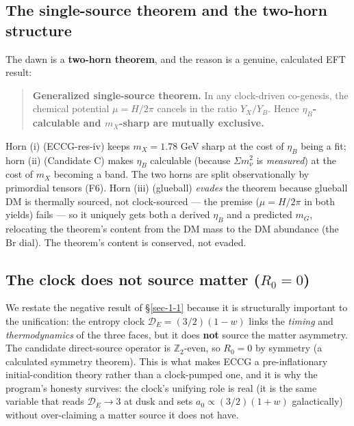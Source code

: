 \documentclass[aps,prd,preprint,nofootinbib,superscriptaddress]{revtex4-2}
\begin{document}
\subsection{The single-source theorem and the two-horn
structure}\label{sec-10-1}

The dawn is a \textbf{two-horn theorem}, and the reason is a genuine,
calculated EFT result:

\begin{quote}
\textbf{Generalized single-source theorem.} In any clock-driven
co-genesis, the chemical potential \(\mu = H/2\pi\) cancels in the ratio
\(Y_X/Y_B\). Hence \textbf{\(\eta_B\)-calculable and \(m_X\)-sharp are
mutually exclusive.}
\end{quote}

Horn (i) (ECCG-res-iv) keeps \(m_X = 1.78\) GeV sharp at the cost of
\(\eta_B\) being a fit; horn (ii) (Candidate C) makes \(\eta_B\)
calculable (because \(\Sigma m_\nu^{2}\) is \emph{measured}) at the cost
of \(m_X\) becoming a band. The two horns are split observationally by
primordial tensors (F6). Horn (iii) (glueball) \emph{evades} the theorem
because glueball DM is thermally sourced, not clock-sourced --- the
premise (\(\mu = H/2\pi\) in both yields) fails --- so it uniquely gets
both a derived \(\eta_B\) and a predicted \(m_G\), relocating the
theorem's content from the DM mass to the DM abundance (the
\(\mathrm{Br}\) dial). The theorem's content is conserved, not evaded.

\subsection{\texorpdfstring{The clock does not source matter
(\(R_0 = 0\))}{The clock does not source matter ()}}\label{sec-10-2}

We restate the negative result of §\ref{sec-1-1} because it is
structurally important to the unification: the entropy clock
\(\mathcal{D}_E = (3/2)(1-w)\) links the \emph{timing} and
\emph{thermodynamics} of the three faces, but it does \textbf{not}
source the matter asymmetry. The candidate direct-source operator is
\(\mathbb{Z}_2\)-even, so \(R_0 = 0\) by symmetry (a calculated symmetry
theorem). This is what makes ECCG a pre-inflationary initial-condition
theory rather than a clock-pumped one, and it is why the program's
honesty survives: the clock's unifying role is real (it is the same
variable that reads \(\mathcal{D}_E \to 3\) at dusk and sets
\(a_0 \propto (3/2)(1+w)\) galactically) without over-claiming a matter
source it does not have.
\end{document}
